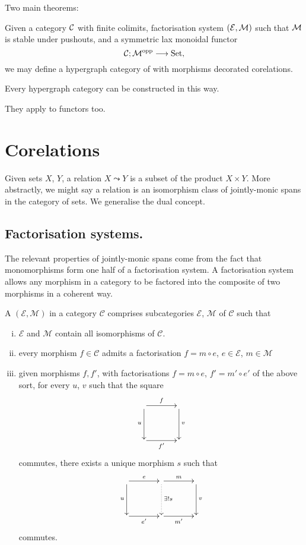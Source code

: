 Two main theorems: 
\begin{theorem}
Given a category $\mathcal C$ with finite colimits, factorisation system $(\mathcal E,\mathcal
M)$ such that $\mathcal M$ is stable under pushouts, and a symmetric lax monoidal functor 
\[
  \mathcal C; \mathcal M^{\mathrm{opp}} \longrightarrow \mathrm{Set},
\]
we may define a hypergraph category of with morphisms decorated corelations.
\end{theorem}
\begin{theorem}
Every hypergraph category can be constructed in this way.
\end{theorem}

They apply to functors too.



\section{Corelations}

Given sets $X$, $Y$, a relation $X \leadsto Y$ is a subset of the product $X
\times Y$. More abstractly, we might say a relation is an isomorphism class of
jointly-monic spans in the category of sets. We generalise the dual concept.

\subsection{Factorisation systems.}
The relevant properties of jointly-monic spans come from the fact that
monomorphisms form one half of a factorisation system. A factorisation system
allows any morphism in a category to be factored into the composite of two
morphisms in a coherent way.

\begin{definition}
  A  $(\mathcal E,\mathcal M)$ in a category $\mathcal C$
  comprises subcategories $\mathcal E$, $\mathcal M$ of $\mathcal C$ such that
  \begin{enumerate}[(i)]
    \item $\mathcal E$ and $\mathcal M$ contain all isomorphisms of $\mathcal
      C$.
    \item  every morphism $f \in \mathcal C$ admits a factorisation $f=m \circ e$, $e \in
  \mathcal E$, $m \in \mathcal M$
\item given morphisms $f,f'$, with factorisations $f = m \circ e$, $f' = m' \circ
  e'$ of the above sort, for every $u$, $v$ such that the square
  \[
    \xymatrixcolsep{3pc}
    \xymatrixrowsep{3pc}
    \xymatrix{
       \ar[r]^f \ar[d]_u &  \ar[d]^v \\
       \ar[r]_{f'} & 
    }
  \]
  commutes, there exists a unique morphism $s$ such that
  \[
    \xymatrixcolsep{3pc}
    \xymatrixrowsep{3pc}
    \xymatrix{
      \ar[r]^e \ar[d]_u & \ar[r]^m \ar@{.>}[d]^{\exists! s} &  \ar[d]^v \\
       \ar[r]_{e'}& \ar[r]_{m'} & 
    }
  \]
  commutes.
  \end{enumerate}
\end{definition}

